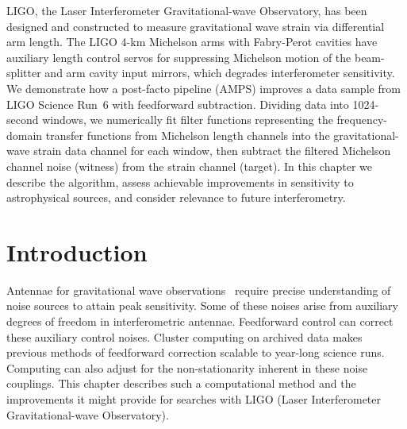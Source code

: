 LIGO, the Laser Interferometer Gravitational-wave Observatory, has been designed and constructed to measure gravitational wave strain via differential arm length. The LIGO 4-km Michelson arms with Fabry-Perot cavities have auxiliary length control servos for suppressing Michelson motion of the beam-splitter and arm cavity input mirrors, which degrades interferometer sensitivity. We demonstrate how a post-facto pipeline (AMPS) improves a data sample from LIGO Science Run~6 with feedforward subtraction. Dividing data into 1024-second windows, we numerically fit filter functions representing the frequency-domain transfer functions from Michelson length channels into the gravitational-wave strain data channel for each window, then subtract the filtered Michelson channel noise (witness) from the strain channel (target). In this chapter we describe the algorithm, assess achievable improvements in sensitivity to astrophysical sources, and consider relevance to future interferometry.



    \section{Introduction}
    \label{introduction}

Antennae for gravitational wave observations~\cite{Thorne300} require precise understanding of noise sources to attain peak sensitivity. Some of these noises arise from auxiliary degrees of freedom in interferometric antennae. Feedforward control can correct these auxiliary control noises. Cluster computing on archived data makes previous methods of feedforward correction scalable to year-long science runs. Computing can also adjust for the non-stationarity inherent in these noise couplings. This chapter describes such a computational method and the improvements it might provide for searches with LIGO (Laser Interferometer Gravitational-wave Observatory).

